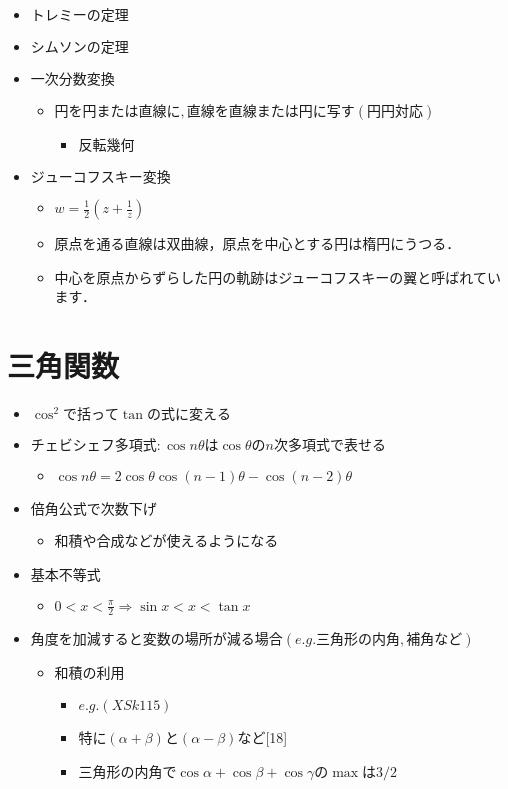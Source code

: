 \documentclass[dvipdfmx,uplatex]{jsarticle}
\begin{document}
\begin{itemize}
	\item $ トレミーの定理$
	\item $ シムソンの定理$
	\item $ 一次分数変換$
	\begin{itemize}
		\item $ 円を円または直線に,直線を直線または円に写す(円円対応)$
		\begin{itemize}
			\item $ 反転幾何$
		\end{itemize}
	\end{itemize}
	\item $ ジューコフスキー変換$
	\begin{itemize}
		\item $ w = \frac{1}{2} \left( z + \frac{1}{z} \right)$
		\item 原点を通る直線は双曲線，原点を中心とする円は楕円にうつる．
		\item 中心を原点からずらした円の軌跡はジューコフスキーの翼と呼ばれています．
	\end{itemize}
\end{itemize}

\section{三角関数}
\begin{itemize}
	\item $ \cos^{2} で括って \tan の式に変える$
	\item $ チェビシェフ多項式: \cos nθ は \cos θ の n 次多項式で表せる$
	\begin{itemize}
		\item $\cos n\theta = 2\cos \theta \cos (n-1)\theta - \cos (n-2)\theta$
	\end{itemize}
	\item $ 倍角公式で次数下げ$
	\begin{itemize}
		\item 和積や合成などが使えるようになる
	\end{itemize}
	\item $ 基本不等式$
	\begin{itemize}
		\item $ 0 < x < \frac{ \pi }{2} \Rightarrow \sin x < x < \tan x$
	\end{itemize}
	\item $ 角度を加減すると変数の場所が減る場合(e.g.三角形の内角,補角など)$
	\begin{itemize}
		\item $ 和積の利用$
		\begin{itemize}
			\item $ e.g. (XSk115)$
			\item 特に$( \alpha + \beta )と( \alpha - \beta )$など[18]
			\item $三角形の内角で \cos \alpha + \cos \beta + \cos \gamma の \max は3/2$
		\end{itemize}
	\end{itemize}
\end{itemize}
\end{document}
